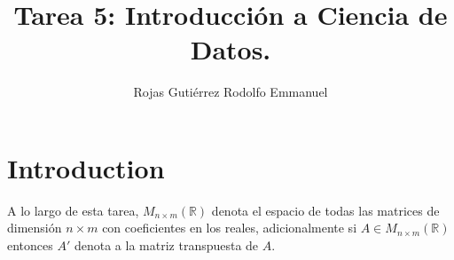 \documentclass[10.5pt,notitlepage]{article}
\title{Tarea 5: Introducción a Ciencia de Datos.}
\author{Rojas Gutiérrez Rodolfo Emmanuel}
\newcommand{\RR}{\mathbb{R}}
\theoremstyle{plain}
\begin{document}
\maketitle


\section{Introduction}
A lo largo de esta tarea, \(M_{n\times m}(\RR)\) denota el espacio de todas las matrices de dimensión \(n\times m\) con coeficientes en los reales, adicionalmente si \(A \in M_{n\times m}(\RR)\) entonces \(A'\) denota a la matriz transpuesta de \(A\).

\setcounter{exo}{0}

\begin{exo}

\end{exo}
\end{document}
